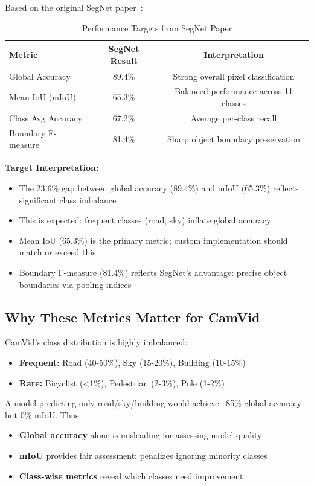 \documentclass[11pt,a4paper]{report}
\begin{document}
Based on the original SegNet paper~\cite{badrinarayanan2015segnet}:

\begin{table}[H]
\centering
\caption{Performance Targets from SegNet Paper}
\label{tab:targets}
\small
\begin{tabular}{lcc}
\toprule
\rowcolor{tableheader}
\textbf{Metric} & \textbf{SegNet Result} & \textbf{Interpretation} \\
\midrule
Global Accuracy & 89.4\% & Strong overall pixel classification \\
Mean IoU (mIoU) & 65.3\% & Balanced performance across 11 classes \\
Class Avg Accuracy & 67.2\% & Average per-class recall \\
Boundary F-measure & 81.4\% & Sharp object boundary preservation \\
\bottomrule
\end{tabular}
\end{table}

\textbf{Target Interpretation:}
\begin{itemize}
  \item The 23.6\% gap between global accuracy (89.4\%) and mIoU (65.3\%) reflects significant class imbalance
  \item This is expected: frequent classes (road, sky) inflate global accuracy
  \item Mean IoU (65.3\%) is the primary metric; custom implementation should match or exceed this
  \item Boundary F-measure (81.4\%) reflects SegNet's advantage: precise object boundaries via pooling indices
\end{itemize}

\subsection{Why These Metrics Matter for CamVid}

CamVid's class distribution is highly imbalanced:
\begin{itemize}
  \item \textbf{Frequent:} Road (40-50\%), Sky (15-20\%), Building (10-15\%)
  \item \textbf{Rare:} Bicyclist (<1\%), Pedestrian (2-3\%), Pole (1-2\%)
\end{itemize}

A model predicting only road/sky/building would achieve ~85\% global accuracy but 0\% mIoU. Thus:
\begin{itemize}
  \item \textbf{Global accuracy} alone is misleading for assessing model quality
  \item \textbf{mIoU} provides fair assessment: penalizes ignoring minority classes
  \item \textbf{Class-wise metrics} reveal which classes need improvement
\end{itemize}
\end{document}
